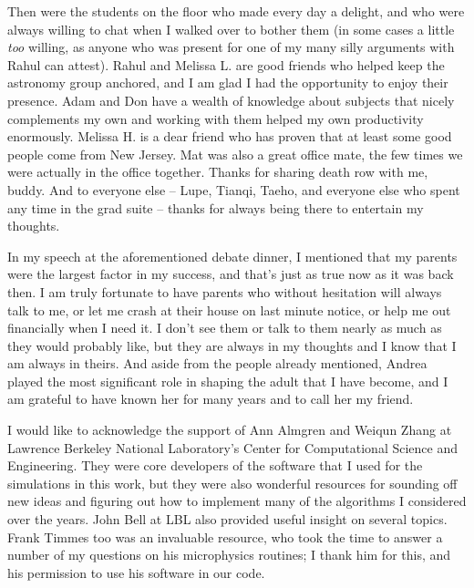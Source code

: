 \documentclass[12pt]{article}
\begin{document}
Then were the students on the floor who made every day a delight, and who
were always willing to chat when I walked over to bother them (in some cases
a little \textit{too} willing, as anyone who was present for one of my many
silly arguments with Rahul can attest). Rahul and Melissa L. are good friends
who helped keep the astronomy group anchored, and I am glad I had the
opportunity to enjoy their presence. Adam and Don have a wealth of knowledge
about subjects that nicely complements my own and working with them helped my
own productivity enormously. Melissa H. is a dear friend who has proven
that at least some good people come from New Jersey. Mat
was also a great office mate, the few times we were actually in the office
together. Thanks for sharing death row with me, buddy. And to everyone else
-- Lupe, Tianqi, Taeho, and everyone else who spent any time in the grad
suite -- thanks for always being there to entertain my thoughts.

In my speech at the aforementioned debate dinner, I mentioned that my
parents were the largest factor in my success, and that's just as true
now as it was back then. I am truly fortunate to have parents who without
hesitation will always talk to me, or let me crash at their house on
last minute notice, or help me out financially when I need it. I don't
see them or talk to them nearly as much as they would probably like,
but they are always in my thoughts and I know that I am always in theirs.
And aside from the people already mentioned, Andrea played the most significant
role in shaping the adult that I have become, and I am grateful to have known
her for many years and to call her my friend.

I would like to acknowledge the support of Ann Almgren and Weiqun
Zhang at Lawrence Berkeley National Laboratory's Center for Computational
Science and Engineering. They were core developers of the software that
I used for the simulations in this work, but they were also wonderful resources
for sounding off new ideas and figuring out how to implement many of the
algorithms I considered over the years. John Bell at LBL also provided useful
insight on several topics. Frank Timmes too was an invaluable resource, who
took the time to answer a number of my questions on his microphysics routines;
I thank him for this, and his permission to use his software in our code.
\end{document}

